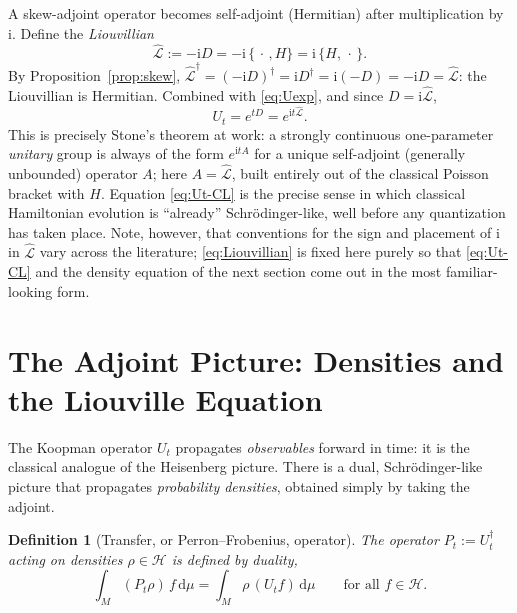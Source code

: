 \documentclass[11pt]{article}
\newtheorem{definition}[proposition]{Definition}
\theoremstyle{remark}
\newcommand{\PB}[2]{\{#1,#2\}}
\newcommand{\CL}{\widehat{\mathcal{L}}}
\newcommand{\dd}{\mathrm{d}}
\newcommand{\ii}{\mathrm{i}}
\begin{document}
A skew-adjoint operator becomes self-adjoint (Hermitian) after multiplication by $\ii$. Define the \emph{Liouvillian}
\begin{equation}
\boxed{\ \CL := -\ii D = -\ii\,\PB{\,\cdot\,}{H} = \ii\,\PB{H}{\,\cdot\,}.\ }
\label{eq:Liouvillian}
\end{equation}
By Proposition~\ref{prop:skew}, $\CL^\dagger=(-\ii D)^\dagger = \ii D^\dagger = \ii(-D)=-\ii D=\CL$: the Liouvillian is Hermitian. Combined with \eqref{eq:Uexp}, and since $D=\ii\CL$,
\begin{equation}
U_t = e^{tD} = e^{\ii t\CL}.
\label{eq:Ut-CL}
\end{equation}
This is precisely Stone's theorem \cite{Stone1932} at work: a strongly continuous one-parameter \emph{unitary} group is always of the form $e^{\ii t A}$ for a unique self-adjoint (generally unbounded) operator $A$; here $A=\CL$, built entirely out of the classical Poisson bracket with $H$. Equation \eqref{eq:Ut-CL} is the precise sense in which classical Hamiltonian evolution is ``already'' Schr\"odinger-like, well before any quantization has taken place. Note, however, that conventions for the sign and placement of $\ii$ in $\CL$ vary across the literature; \eqref{eq:Liouvillian} is fixed here purely so that \eqref{eq:Ut-CL} and the density equation of the next section come out in the most familiar-looking form.

\section{The Adjoint Picture: Densities and the Liouville Equation}
\label{sec:liouville}

The Koopman operator $U_t$ propagates \emph{observables} forward in time: it is the classical analogue of the Heisenberg picture. There is a dual, Schr\"odinger-like picture that propagates \emph{probability densities}, obtained simply by taking the adjoint.

\begin{definition}[Transfer, or Perron--Frobenius, operator]
The operator $P_t := U_t^\dagger$ acting on densities $\rho\in\mathcal H$ is defined by duality,
\begin{equation}
\int_M (P_t\rho)\,f\,\dd\mu = \int_M \rho\,(U_tf)\,\dd\mu \qquad \text{for all } f\in\mathcal H.
\end{equation}
\end{definition}
\end{document}
